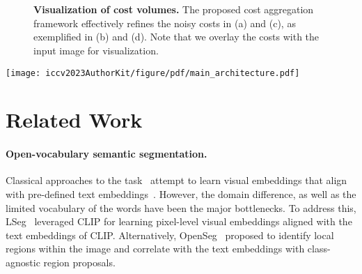 \documentclass[10pt,twocolumn,letterpaper]{article}
\newcommand{\ours}{CAT-Seg\xspace}
\begin{document}
 
 \begin{figure}[t]
  \centering
  \renewcommand{\thesubfigure}{}
     \hfill
     \hfill\\
    \vspace{-5pt}
     \hfill
     \hfill\\

    \vspace{-10pt}
    \caption{\textbf{Visualization of cost volumes.} The proposed cost aggregation framework effectively refines the noisy costs in (a) and (c), as exemplified in (b) and (d). Note that we overlay the costs with the input image for visualization.}
    \vspace{-10pt}
  \label{fig:refinement_qual}
\end{figure} 

\begin{figure*}
    \centering
    \texttt{[image: iccv2023AuthorKit/figure/pdf/main\_architecture.pdf]}\hfill\\
    \vspace{-10pt}
    \caption{\textbf{Overall architecture of \ours.} Our network consists of a cost computation, aggregation module consisting of spatial aggregation and inter-class aggregation and an upsampling decoder.}
    \label{fig:overall}\vspace{-10pt}
\end{figure*} 
\section{Related Work}

\paragraph{Open-vocabulary semantic segmentation.} Classical approaches to the task~\cite{zhao2017open, bucher2019zero, xian2019semantic} attempt to learn visual embeddings that align with pre-defined text embeddings~\cite{miller1998wordnet, mikolov2013efficient}. However, the domain difference, as well as the limited vocabulary of the words have been the major bottlenecks. To address this, LSeg~\cite{li2022language} leveraged CLIP for learning pixel-level visual embeddings aligned with the text embeddings of CLIP. Alternatively, OpenSeg~\cite{ghiasi2022scaling} proposed to identify local regions within the image and correlate with the text embeddings with class-agnostic region proposals.
\end{document}
